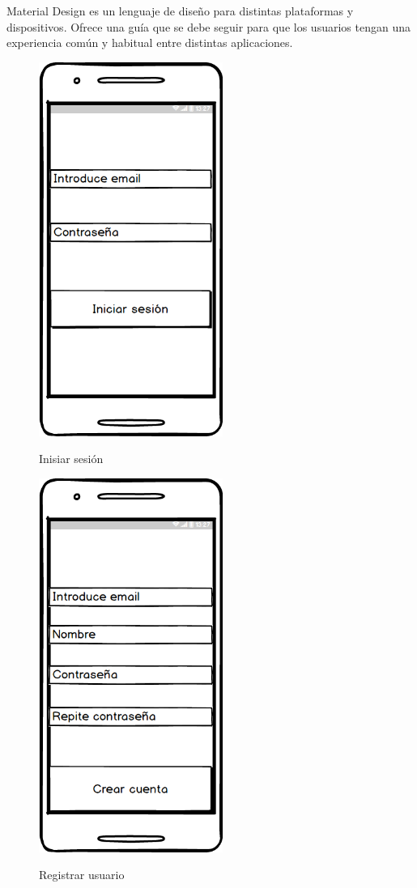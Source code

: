 Material Design es un lenguaje de diseño para distintas plataformas y dispositivos. Ofrece una guía que se debe seguir para que los usuarios  tengan una experiencia común y habitual entre distintas aplicaciones.


	
	
	
	\begin{figure}[htbp]
\begin{minipage}[b]{0.5\linewidth} %
\centering
\includegraphics[width=6cm]{maqueta/Iniciar.png}
 \label{figura1}
\caption{Inisiar sesión}

\end{minipage}
\hspace{0.5cm} %
\begin{minipage}[b]{0.5\linewidth}
\centering
\includegraphics[width=6cm]{maqueta/Registrarse.png}
 \label{figura2}
\caption{Registrar usuario}


\end{minipage}
\end{figure}
